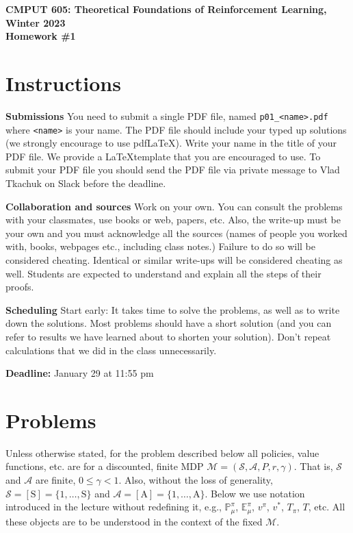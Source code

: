 \documentclass{article}
\newcommand{\hwnumber}{1}
\DeclareMathOperator*{\1}{\mathbbm{1}}
\newcommand{\E}{\mathbb E}
\theoremstyle{definition}
\theoremstyle{remark}
\newcommand{\cS}{\mathcal{S}}
\newcommand{\cA}{\mathcal{A}}
\begin{document}
\begin{center}
{\Large \textbf{CMPUT 605: Theoretical Foundations of Reinforcement Learning, Winter 2023\\ Homework \#\hwnumber}}
\end{center}

\section*{Instructions}
\textbf{Submissions}
You need to submit a single PDF file, named {\tt p0\hwnumber\_<name>.pdf} where {\tt <name>} is your name.
The PDF file should include your typed up solutions (we strongly encourage to use pdf\LaTeX). 
Write your name in the title of your PDF file.
We provide a \LaTeX template that you are encouraged to use.
To submit your PDF file you should send the PDF file via private message to Vlad Tkachuk on Slack before the deadline.

\textbf{Collaboration and sources}
Work on your own. You can consult the problems with your classmates, use books
or web, papers, etc.
Also, the write-up must be your own and you must acknowledge all the
sources (names of people you worked with, books, webpages etc., including class notes.) 
Failure to do so will be considered cheating.  
Identical or similar write-ups will be considered cheating as well.
Students are expected to understand and explain all the steps of their proofs.

\textbf{Scheduling}
Start early: It takes time to solve the problems, as well as to write down the solutions. Most problems should have a short solution (and you can refer to results we have learned about to shorten your solution). Don't repeat calculations that we did in the class unnecessarily.

\vspace{0.3cm}

\textbf{Deadline:} January 29 at 11:55 pm

\newcommand{\cM}{\mathcal{M}}
\newcommand{\nS}{\mathrm{S}}
\newcommand{\nA}{\mathrm{A}}
\newcommand{\PP}{\mathbb{P}}
\newcommand{\RR}{\mathbb{R}}
\newcommand{\ip}[1]{\langle #1 \rangle}

\section*{Problems}
Unless otherwise stated, for the problem described below all policies, value functions, etc. are for
a discounted, finite MDP $\cM=(\cS,\cA,P,r,\gamma)$. That is, $\cS$ and $\cA$ are finite, $0\le \gamma<1$.
Also, without the loss of generality, $\cS = [\nS]=\{1,\dots,\nS\}$ and $\cA = [\nA]=\{1,\dots,\nA\}$.
Below we use notation introduced in the lecture without redefining it, e.g., $\PP_\mu^\pi$, $\E_\mu^\pi$, $v^\pi$, $v^*$, $T_\pi$, $T$, etc. All these objects are to be understood in the context of the fixed $\cM$.
\end{document}
